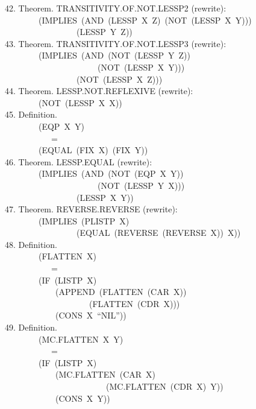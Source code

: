 \documentclass[10pt]{book}
\newenvironment{pubasis}{\begin{flushleft}}{\end{flushleft}}
\begin{document}
\begin{pubasis}
42.     Theorem.  TRANSITIVITY.OF.NOT.LESSP2 (rewrite):\\
~~~~~~~~(IMPLIES~(AND~(LESSP~X~Z)~(NOT~(LESSP~X~Y)))\\
~~~~~~~~~~~~~~~~~(LESSP~Y~Z))\\

43.     Theorem.  TRANSITIVITY.OF.NOT.LESSP3 (rewrite):\\
~~~~~~~~(IMPLIES~(AND~(NOT~(LESSP~Y~Z))\\
~~~~~~~~~~~~~~~~~~~~~~(NOT~(LESSP~X~Y)))\\
~~~~~~~~~~~~~~~~~(NOT~(LESSP~X~Z)))\\

44.     Theorem.  LESSP.NOT.REFLEXIVE (rewrite):\\
~~~~~~~~(NOT~(LESSP~X~X))\\

45.     Definition.\\
~~~~~~~~(EQP~X~Y)\\
~~~~~~~~~~~=\\
~~~~~~~~(EQUAL~(FIX~X)~(FIX~Y))\\

46.     Theorem.  LESSP.EQUAL (rewrite):\\
~~~~~~~~(IMPLIES~(AND~(NOT~(EQP~X~Y))\\
~~~~~~~~~~~~~~~~~~~~~~(NOT~(LESSP~Y~X)))\\
~~~~~~~~~~~~~~~~~(LESSP~X~Y))\\

47.     Theorem.  REVERSE.REVERSE (rewrite):\\
~~~~~~~~(IMPLIES~(PLISTP~X)\\
~~~~~~~~~~~~~~~~~(EQUAL~(REVERSE~(REVERSE~X))~X))\\

48.     Definition.\\
~~~~~~~~(FLATTEN~X)\\
~~~~~~~~~~~=\\
~~~~~~~~(IF~(LISTP~X)\\
~~~~~~~~~~~~(APPEND~(FLATTEN~(CAR~X))\\
~~~~~~~~~~~~~~~~~~~~(FLATTEN~(CDR~X)))\\
~~~~~~~~~~~~(CONS~X~``NIL''))\\

49.     Definition.\\
~~~~~~~~(MC.FLATTEN~X~Y)\\
~~~~~~~~~~~=\\
~~~~~~~~(IF~(LISTP~X)\\
~~~~~~~~~~~~(MC.FLATTEN~(CAR~X)\\
~~~~~~~~~~~~~~~~~~~~~~~~(MC.FLATTEN~(CDR~X)~Y))\\
~~~~~~~~~~~~(CONS~X~Y))\\


\end{pubasis}
\end{document}
